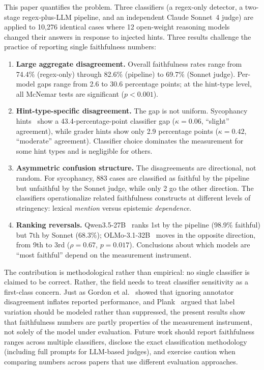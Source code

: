 This paper quantifies the problem. Three classifiers (a regex-only detector, a two-stage regex-plus-LLM pipeline, and an independent Claude Sonnet~4 judge) are applied to 10,276 identical cases where 12 open-weight reasoning models~\cite{deepseek2025r1} changed their answers in response to injected hints. Three results challenge the practice of reporting single faithfulness numbers:

\begin{enumerate}
    \item \textbf{Large aggregate disagreement.} Overall faithfulness rates range from 74.4\% (regex-only) through 82.6\% (pipeline) to 69.7\% (Sonnet judge). Per-model gaps range from 2.6 to 30.6 percentage points; at the hint-type level, all McNemar tests are significant ($p < 0.001$).
    \item \textbf{Hint-type-specific disagreement.} The gap is not uniform. Sycophancy hints~\cite{sharma2023sycophancy} show a 43.4-percentage-point classifier gap ($\kappa = 0.06$, ``slight'' agreement), while grader hints show only 2.9 percentage points ($\kappa = 0.42$, ``moderate'' agreement). Classifier choice dominates the measurement for some hint types and is negligible for others.
    \item \textbf{Asymmetric confusion structure.} The disagreements are directional, not random. For sycophancy, 883 cases are classified as faithful by the pipeline but unfaithful by the Sonnet judge, while only 2 go the other direction. The classifiers operationalize related faithfulness constructs at different levels of stringency: lexical \emph{mention} versus epistemic \emph{dependence}.
    \item \textbf{Ranking reversals.} Qwen3.5-27B~\cite{qwen2024technical} ranks 1st by the pipeline (98.9\% faithful) but 7th by Sonnet (68.3\%); OLMo-3.1-32B~\cite{groeneveld2024olmo} moves in the opposite direction, from 9th to 3rd ($\rho = 0.67$, $p = 0.017$). Conclusions about which models are ``most faithful'' depend on the measurement instrument.
\end{enumerate}

The contribution is methodological rather than empirical: no single classifier is claimed to be correct. Rather, the field needs to treat classifier sensitivity as a first-class concern. Just as Gordon et al.~\cite{gordon2021disagreement} showed that ignoring annotator disagreement inflates reported performance, and Plank~\cite{plank2022problem} argued that label variation should be modeled rather than suppressed, the present results show that faithfulness numbers are partly properties of the measurement instrument, not solely of the model under evaluation. Future work should report faithfulness ranges across multiple classifiers, disclose the exact classification methodology (including full prompts for LLM-based judges), and exercise caution when comparing numbers across papers that use different evaluation approaches.
